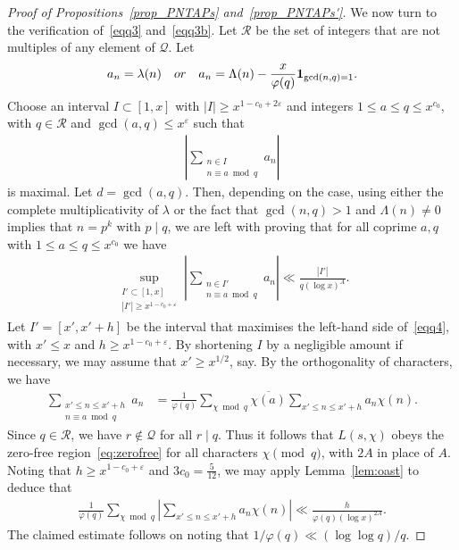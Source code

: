 \documentclass[11pt,letterpaper]{amsart}
\renewcommand{\leq}{\leqslant}
\renewcommand{\geq}{\geqslant}
\theoremstyle{definition}
\numberwithin{equation}{section}
\DeclareMathOperator{\n}{N}
\newcommand{\0}{\mathbf{0}}
\begin{document}
\begin{proof}[Proof of Propositions~\ref{prop_PNTAPs} and~\ref{prop_PNTAPs'}]
 We now turn to the verification of~\eqref{eqq3} and~\eqref{eqq3b}. 
Let $\mathcal{R}$ be the set of integers that are not multiples of any element of $\mathcal{Q}$. Let 
$$a_n=\lambda(n)\quad \textnormal{or}\quad a_n=\Lambda(n)-\frac{x}{\varphi(q)}\mathbf{1}_{\gcd(n,q)=1}.$$ 
Choose an interval $I\subset [1,x]$ with $|I|\geq x^{1-c_0+2\varepsilon}$ and integers $1\leq a\leq q\leq x^{c_0}$, with $q\in \mathcal{R}$ and $\gcd(a,q)\leq x^{\varepsilon}$ such that 
\begin{align*}
\left|\sum_{\substack{n\in I\\n\equiv a\bmod q}}a_n\right| \end{align*}
is maximal. Let $d=\gcd(a,q)$. Then, depending on the case, using either the complete multiplicativity of $\lambda$ or the fact that $\gcd(n,q)>1$ and $\Lambda(n)\neq 0$ implies that $n=p^k$ with $p\mid q$, we 
are left with
proving that for all coprime $a,q$ with $1\leq a\leq q\leq x^{c_0}$ we have
\begin{align}\label{eqq4}
\sup_{\substack{I'\subset [1,x]\\|I'|\geq x^{1-c_0+\varepsilon}}} 
\left|\sum_{\substack{n\in I'\\n\equiv a\bmod q}}a_n\right|\ll \frac{|I'|}{q(\log x)^{A}}. \end{align}
Let $I'=[x',x'+h]$ be the interval that maximises the left-hand side of~\eqref{eqq4}, with $x'\leq x$ and 
$h\geq x^{1-c_0+\varepsilon}$. By shortening $I$ by a negligible amount if necessary, we may assume that $x'\geq x^{1/2}$, say.
By the orthogonality of characters, we have
\begin{align*}
\sum_{\substack{x'\leq n\leq x'+h\\n\equiv a\bmod q}}a_n&=\frac{1}{\varphi(q)}\sum_{\chi\bmod q}\overline{\chi(a)}\sum_{x'\leq n\leq x'+h}a_n\chi(n).
\end{align*}
Since $q\in \mathcal{R}$, we have  $r\not \in \mathcal{Q}$ for all $r\mid q$.
Thus  it follows that $L(s,\chi)$ obeys the zero-free region~\eqref{eq:zerofree} for all characters $\chi \pmod q$, with $2A$ in place of $A$. 
Noting that 
$h\geq  x^{1-c_0+\varepsilon}$ and $3c_0=\frac{5}{12}$, we may apply   Lemma~\ref{lem:oast} 
to deduce that 
\begin{align*}
\frac{1}{\varphi(q)}\sum_{\chi \bmod q}\left|\sum_{x'\leq n\leq x'+h}a_n\chi(n)\right|
\ll \frac{h}{\varphi(q)(\log x)^{2A}}.   
\end{align*}
The claimed estimate follows on noting that  $1/\varphi(q)\ll (\log \log q)/q$.
\end{proof}
\end{document}
